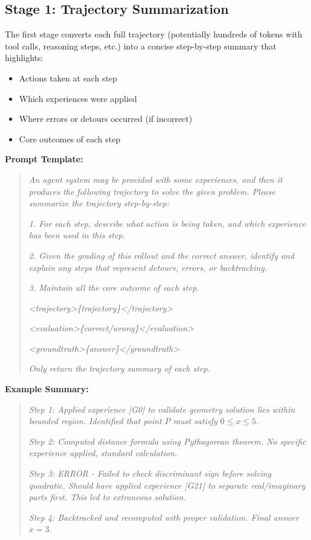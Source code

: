 \documentclass[11pt,a4paper]{article}
\begin{document}
\subsection{Stage 1: Trajectory Summarization}

The first stage converts each full trajectory (potentially hundreds of tokens with tool calls, reasoning steps, etc.) into a concise step-by-step summary that highlights:
\begin{itemize}
    \item Actions taken at each step
    \item Which experiences were applied
    \item Where errors or detours occurred (if incorrect)
    \item Core outcomes of each step
\end{itemize}

\textbf{Prompt Template:}
\begin{quote}
\small
\textit{An agent system may be provided with some experiences, and then it produces the following trajectory to solve the given problem. Please summarize the trajectory step-by-step:}

\textit{1. For each step, describe what action is being taken, and which experience has been used in this step.}

\textit{2. Given the grading of this rollout and the correct answer, identify and explain any steps that represent detours, errors, or backtracking.}

\textit{3. Maintain all the core outcome of each step.}

\textit{<trajectory>\{trajectory\}</trajectory>}

\textit{<evaluation>\{correct/wrong\}</evaluation>}

\textit{<groundtruth>\{answer\}</groundtruth>}

\textit{Only return the trajectory summary of each step.}
\end{quote}

\textbf{Example Summary:}
\begin{quote}
\small
\textit{Step 1: Applied experience [G0] to validate geometry solution lies within bounded region. Identified that point $P$ must satisfy $0 \leq x \leq 5$.}

\textit{Step 2: Computed distance formula using Pythagorean theorem. No specific experience applied, standard calculation.}

\textit{Step 3: ERROR - Failed to check discriminant sign before solving quadratic. Should have applied experience [G21] to separate real/imaginary parts first. This led to extraneous solution.}

\textit{Step 4: Backtracked and recomputed with proper validation. Final answer $x = 3$.}
\end{quote}
\end{document}
